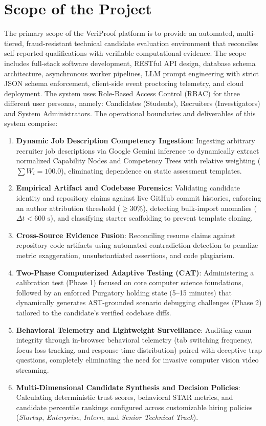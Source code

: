 \section{Scope of the Project}
The primary scope of the VeriProof platform is to provide an automated, multi-tiered, fraud-resistant technical candidate evaluation environment that reconciles self-reported qualifications with verifiable computational evidence. The scope includes full-stack software development, RESTful API design, database schema architecture, asynchronous worker pipelines, LLM prompt engineering with strict JSON schema enforcement, client-side event proctoring telemetry, and cloud deployment. The system uses Role-Based Access Control (RBAC) for three different user personas, namely: Candidates (Students), Recruiters (Investigators) and System Administrators. The operational boundaries and deliverables of this system comprise:
\begin{enumerate}
    \item \textbf{Dynamic Job Description Competency Ingestion}: Ingesting arbitrary recruiter job descriptions via Google Gemini inference to dynamically extract normalized Capability Nodes and Competency Trees with relative weighting ($\sum W_i = 100.0$), eliminating dependence on static assessment templates.
    \item \textbf{Empirical Artifact and Codebase Forensics}: Validating candidate identity and repository claims against live GitHub commit histories, enforcing an author attribution threshold ($\ge 30\%$), detecting bulk-import anomalies ($\Delta t < 600\text{ s}$), and classifying starter scaffolding to prevent template cloning.
    \item \textbf{Cross-Source Evidence Fusion}: Reconciling resume claims against repository code artifacts using automated contradiction detection to penalize metric exaggeration, unsubstantiated assertions, and code plagiarism.
    \item \textbf{Two-Phase Computerized Adaptive Testing (CAT)}: Administering a calibration test (Phase 1) focused on core computer science foundations, followed by an enforced Purgatory holding state (5--15 minutes) that dynamically generates AST-grounded scenario debugging challenges (Phase 2) tailored to the candidate's verified codebase diffs.
    \item \textbf{Behavioral Telemetry and Lightweight Surveillance}: Auditing exam integrity through in-browser behavioral telemetry (tab switching frequency, focus-loss tracking, and response-time distribution) paired with deceptive trap questions, completely eliminating the need for invasive computer vision video streaming.
    \item \textbf{Multi-Dimensional Candidate Synthesis and Decision Policies}: Calculating deterministic trust scores, behavioral STAR metrics, and candidate percentile rankings configured across customizable hiring policies (\textit{Startup}, \textit{Enterprise}, \textit{Intern}, and \textit{Senior Technical Track}).
\end{enumerate}

